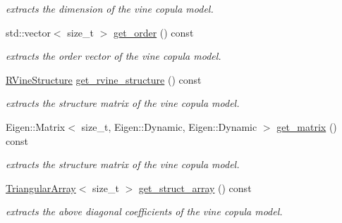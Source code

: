 \begin{DoxyCompactItemize}
\begin{DoxyCompactList}\small\item\em extracts the dimension of the vine copula model. \end{DoxyCompactList}\item 
\mbox{\label{classvinecopulib_1_1_vinecop_a4aff71e7b65688ff04205ec66b34473e}} 
std\+::vector$<$ size\+\_\+t $>$ \hyperlink{classvinecopulib_1_1_vinecop_a4aff71e7b65688ff04205ec66b34473e}{get\+\_\+order} () const
\begin{DoxyCompactList}\small\item\em extracts the order vector of the vine copula model. \end{DoxyCompactList}\item 
\mbox{\label{classvinecopulib_1_1_vinecop_aeaaad4d204e86a0df21becfa26032e47}} 
\hyperlink{classvinecopulib_1_1_r_vine_structure}{R\+Vine\+Structure} \hyperlink{classvinecopulib_1_1_vinecop_aeaaad4d204e86a0df21becfa26032e47}{get\+\_\+rvine\+\_\+structure} () const
\begin{DoxyCompactList}\small\item\em extracts the structure matrix of the vine copula model. \end{DoxyCompactList}\item 
\mbox{\label{classvinecopulib_1_1_vinecop_aab1af57bb6b7e02029dcc3dc2a285314}} 
Eigen\+::\+Matrix$<$ size\+\_\+t, Eigen\+::\+Dynamic, Eigen\+::\+Dynamic $>$ \hyperlink{classvinecopulib_1_1_vinecop_aab1af57bb6b7e02029dcc3dc2a285314}{get\+\_\+matrix} () const
\begin{DoxyCompactList}\small\item\em extracts the structure matrix of the vine copula model. \end{DoxyCompactList}\item 
\mbox{\label{classvinecopulib_1_1_vinecop_a4d0f5a7e4b60e6d58aef3020577aeb5a}} 
\hyperlink{classvinecopulib_1_1_triangular_array}{Triangular\+Array}$<$ size\+\_\+t $>$ \hyperlink{classvinecopulib_1_1_vinecop_a4d0f5a7e4b60e6d58aef3020577aeb5a}{get\+\_\+struct\+\_\+array} () const
\begin{DoxyCompactList}\small\item\em extracts the above diagonal coefficients of the vine copula model. \end{DoxyCompactList}\item 

\end{DoxyCompactItemize}
